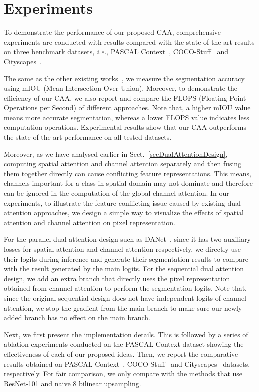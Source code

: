 \documentclass[journal]{IEEEtran}
\begin{document}
\section{Experiments}
\label {sExperements}

To demonstrate the performance of our proposed CAA, comprehensive experiments are conducted with results compared with the state-of-the-art results on three benchmark datasets, \textit{i.e.}, PASCAL Context~\cite{cPascalVOC}, COCO-Stuff~\cite{cCocoStuff} and Cityscapes~\cite{cCityScapes}. 

The same as the other existing works~\cite{cDualAttention, cDeepLab, cEMANet, cOCR}, we measure the segmentation accuracy using mIOU (Mean Intersection Over Union). 
Moreover, to demonstrate the efficiency of our CAA, we also report and compare the FLOPS (Floating Point Operations per Second) of different approaches. 
Note that, a higher mIOU value means more accurate segmentation, whereas a lower FLOPS value indicates less computation operations.
Experimental results show that our CAA outperforms the state-of-the-art performance on all tested datasets.

Moreover, as we have analysed earlier in Sect.~\ref{secDualAttentionDesign}, computing spatial attention and channel attention separately and then fusing them together directly can cause conflicting feature representations. 
This means, channels important for a class in spatial domain may not dominate and therefore can be ignored in the computation of the global channel attention. 
In our experiments, to illustrate the feature conflicting issue caused by existing dual attention approaches, we design a simple way to visualize the effects of spatial attention and channel attention on pixel representation.

For the parallel dual attention design such as DANet~\cite{cDualAttention}, since it has two auxiliary losses for spatial attention and channel attention respectively, we directly use their logits during inference and generate their segmentation results to compare with the result generated by the main logits.
For the sequential dual attention design, we add an extra branch that directly uses the pixel representation obtained from channel attention to perform the segmentation logits. 
Note that, since the original sequential design does not have independent logits of channel attention, we stop the gradient from the main branch to make sure our newly added branch has no effect on the main branch.

Next, we first present the implementation details. 
This is followed by a series of ablation experiments conducted on the PASCAL Context dataset showing the effectiveness of each of our proposed ideas. 
Then, we report the comparative results obtained on PASCAL Context~\cite{cPascalVOC}, COCO-Stuff~\cite{cCocoStuff} and Cityscapes~\cite{cCityScapes} datasets, respectively. 
For fair comparison, we only compare with the methods that use ResNet-101 and naive 8 bilinear upsampling.
\end{document}
